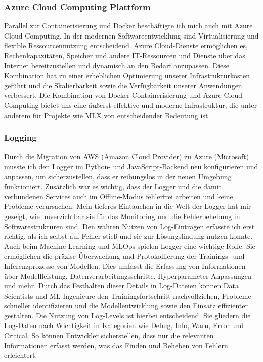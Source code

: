 \documentclass[11pt]{article}
\begin{document}
\subsubsection{Azure Cloud Computing Plattform}
Parallel zur Containerisierung und Docker beschäftigte ich mich auch mit Azure Cloud Computing. In der modernen Softwareentwicklung sind Virtualisierung und flexible Ressourcennutzung entscheidend. Azure Cloud-Dienste ermöglichen es, Rechenkapazitäten, Speicher und andere IT-Ressourcen und Dienste über das Internet bereitzustellen und dynamisch an den Bedarf anzupassen. Diese Kombination hat zu einer erheblichen Optimierung unserer Infrastrukturkosten geführt und die Skalierbarkeit sowie die Verfügbarkeit unserer Anwendungen verbessert. Die Kombination von Docker-Containerisierung und Azure Cloud Computing bietet uns eine äußerst effektive und moderne Infrastruktur, die unter anderem für Projekte wie MLX von entscheidender Bedeutung ist.

\subsubsection{Logging}
Durch die Migration von AWS (Amazon Cloud Provider) zu Azure (Microsoft) musste ich den Logger im Python- und JavaScript-Backend neu konfigurieren und anpassen, um sicherzustellen, dass er reibungslos in der neuen Umgebung funktioniert. Zusätzlich war es wichtig, dass der Logger und die damit verbundenen Services auch im Offline-Modus fehlerfrei arbeiten und keine Probleme verursachen.
\newline
Mein tieferes Eintauchen in die Welt der Logger hat mir gezeigt, wie unverzichtbar sie für das Monitoring und die Fehlerbehebung in Softwarestrukturen sind. Den wahren Nutzen von Log-Einträgen erfasste ich erst richtig, als ich selbst auf Fehler stieß und sie zur Lösungsfindung nutzen konnte. Auch beim Machine Learning und MLOps spielen Logger eine wichtige Rolle. Sie ermöglichen die präzise Überwachung und Protokollierung der Trainings- und Inferenzprozesse von Modellen. Dies umfasst die Erfassung von Informationen über Modellleistung, Datenverarbeitungsschritte, Hyperparameter-Anpassungen und mehr. Durch das Festhalten dieser Details in Log-Dateien können Data Scientists und ML-Ingenieure den Trainingsfortschritt nachvollziehen, Probleme schneller identifizieren und die Modellentwicklung sowie den Einsatz effizienter gestalten.
\newline
Die Nutzung von Log-Levels ist hierbei entscheidend. Sie gliedern die Log-Daten nach Wichtigkeit in Kategorien wie Debug, Info, Warn, Error und Critical. So können Entwickler sicherstellen, dass nur die relevanten Informationen erfasst werden, was das Finden und Beheben von Fehlern erleichtert.
\end{document}
